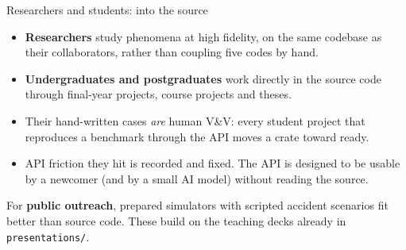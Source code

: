 \documentclass[aspectratio=169]{beamer}
\begin{document}
\begin{frame}{Researchers and students: into the source}
    \begin{itemize}
        \item \textbf{Researchers} study phenomena at high fidelity, on the
              same codebase as their collaborators, rather than coupling five
              codes by hand.
        \item \textbf{Undergraduates and postgraduates} work directly in the
              source code through final-year projects, course projects and
              theses.
        \item Their hand-written cases \emph{are} human V\&V: every student
              project that reproduces a benchmark through the API moves a
              crate toward ready.
        \item API friction they hit is recorded and fixed. The API is
              designed to be usable by a newcomer (and by a small AI model)
              without reading the source.
    \end{itemize}

    \medskip
    \footnotesize
    For \textbf{public outreach}, prepared simulators with scripted accident
    scenarios fit better than source code. These build on the teaching decks
    already in \texttt{presentations/}.
\end{frame}
\end{document}
